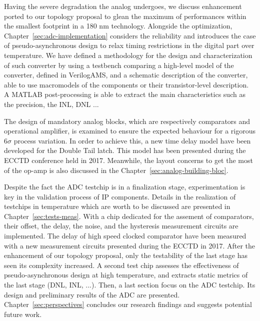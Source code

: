 Having the severe degradation the analog undergoes, we discuss enhancement ported to our topology proposal to glean the maximum of performances within the smallest footprint in a 180 nm technology. Alongside the optimization, Chapter~\ref{sec:adc-implementation} considers the reliability and introduces the case of pseudo-asynchronous design to relax timing restrictions in the digital part over temperature. We have defined a methodology for the design and characterization of such converter by using a testbench comparing a high-level model of the converter, defined in VerilogAMS, and a schematic description of the converter, able to use macromodels of the components or their transistor-level description. A MATLAB post-processing is able to extract the main characteristics such as the precision, the INL, DNL ...

The design of mandatory analog blocks, which are respectively comparators and operational amplifier, is examined to ensure the expected behaviour for a rigorous 6\(\sigma\) process variation. In order to achieve this, a new time delay model have been developed for the Double Tail latch. This model has been presented during the ECCTD conference held in 2017. Meanwhile, the layout concerns to get the most of the op-amp is also discussed in the Chapter~\ref{sec:analog-building-bloc}.

Despite the fact the ADC testchip is in a finalization stage, experimentation is key in the validation process of IP components. Details in the realization of testchips in temperature which are worth to be discussed are presented in Chapter~\ref{sec:tests-meas}. With a chip dedicated for the assement of comparators, their offset, the delay, the noise, and the hysteresis measurement circuits are implemented. The delay of high speed clocked comparator have been measured with a new measurement circuits presented during the ECCTD in 2017. After the enhancement of our topology proposal, only the testability of the last stage has seen its complexity increased. A second test chip assesses the effectiveness of pseudo-asynchronous design at high temperature, and extracts static metrics of the last stage (DNL, INL, ...). Then, a last section focus on the ADC testchip. Its design and preliminary results of the ADC are presented. Chapter~\ref{sec:perspectives} concludes our research findings and suggests potential future work.
